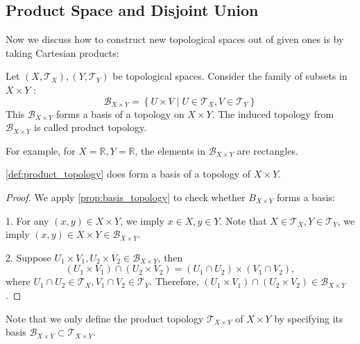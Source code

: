 \begin{example}
\section{Product Space and Disjoint Union}

Now we discuss how to construct new topological spaces out of given ones is by taking Cartesian products:

\begin{definition} \label{def:product_topology} Let \(\left({X,{\mathcal{T}}_X}\right),\left({Y,{\mathcal{T}}_Y}\right)\) be topological spaces. Consider the family of subsets in \(X \times  Y\) :
\[
{\mathcal{B}}_{X \times  Y} = \left\{  {U \times  V \mid  U \in  {\mathcal{T}}_X,V \in  {\mathcal{T}}_Y}\right\}
\]
This \({\mathcal{B}}_{X \times  Y}\) forms a basis of a topology on \(X \times  Y\). The induced topology from \({\mathcal{B}}_{X \times  Y}\) is called product topology.
\end{definition}

For example, for \(X = \mathbb{R},Y = \mathbb{R}\), the elements in \({\mathcal{B}}_{X \times  Y}\) are rectangles.

\begin{proposition}
\autoref{def:product_topology} does form a basis of a topology of $X \times Y$.    
\end{proposition}

\begin{proof}
We apply \autoref{prop:basis_topology} to check whether \({B}_{X \times  Y}\) forms a basis:

1. For any \(\left({x,y}\right)  \in  X \times  Y\), we imply \(x \in  X,y \in  Y\). Note that \(X \in  {\mathcal{T}}_X,Y \in  {\mathcal{T}}_Y\), we imply \(\left({x,y}\right)  \in  X \times  Y \in  {\mathcal{B}}_{X \times  Y}\).

2. Suppose \({U}_{1} \times  {V}_{1},{U}_{2} \times  {V}_{2} \in  {\mathcal{B}}_{X \times  Y}\), then
\[
\left({{U}_{1} \times  {V}_{1}}\right)  \cap  \left({{U}_{2} \times  {V}_{2}}\right)  = \left({{U}_{1} \cap  {U}_{2}}\right)  \times  \left({{V}_{1} \cap  {V}_{2}}\right),
\]
where \({U}_{1} \cap  {U}_{2} \in  {\mathcal{T}}_X,{V}_{1} \cap  {V}_{2} \in  {\mathcal{T}}_Y\). Therefore, \(\left({{U}_{1} \times  {V}_{1}}\right)  \cap  \left({{U}_{2} \times  {V}_{2}}\right)  \in  {\mathcal{B}}_{X \times  Y}\).
\end{proof}

Note that we only define the product topology $\mathcal{T}_{X \times Y}$ of $X \times Y$ by specifying its basis $\mathcal{B}_{X \times Y} \subset \mathcal{T}_{X \times Y}$. 


\end{example}
